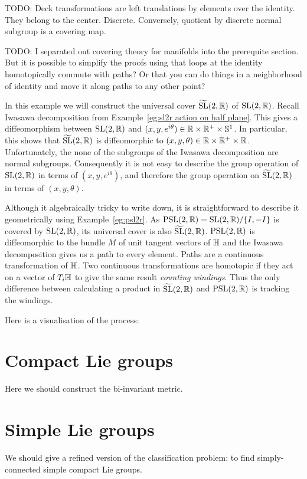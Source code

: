 TODO: Deck transformations are left translations by elements over the identity. They belong to the center. Discrete. Conversely, quotient by discrete normal subgroup is a covering map.

TODO: I separated out covering theory for manifolds into the prerequite section. But it is possible to simplify the proofs using that loops at the identity homotopically commute with paths? Or that you can do things in a neighborhood of identity and move it along paths to any other point?


\begin{example}
In this example we will construct the universal cover $\widetilde{\mathrm{SL}}(2,\mathbb{R})$ of $\mathrm{SL}(2,\mathbb{R})$.
Recall Iwasawa decomposition from Example~\ref{eg:sl2r action on half plane}.
This gives a diffeomorphism between $\mathrm{SL}(2,\mathbb{R})$ and $(x,y,e^{i\theta}) \in \mathbb{R} \times \mathbb{R}^+ \times \mathbb{S}^1$.
In particular, this shows that $\widetilde{\mathrm{SL}}(2,\mathbb{R})$ is diffeomorphic to $(x,y,\theta) \in \mathbb{R} \times \mathbb{R}^+ \times \mathbb{R}$.
Unfortunately, the none of the subgroups of the Iwasawa decomposition are normal subgroups.
Consequently it is not easy to describe the group operation of $\mathrm{SL}(2,\mathbb{R})$ in terms of $(x,y,e^{i\theta})$, and therefore the group operation on $\widetilde{\mathrm{SL}}(2,\mathbb{R})$ in terms of $(x,y,\theta)$.

Although it algebraically tricky to write down, it is straightforward to describe it geometrically using Example~\ref{eg:psl2r}.
As $\mathrm{PSL}(2,\mathbb{R}) = \mathrm{SL}(2,\mathbb{R})/\{I,-I\}$ is covered by $\mathrm{SL}(2,\mathbb{R})$, its universal cover is also $\widetilde{\mathrm{SL}}(2,\mathbb{R})$.
$\mathrm{PSL}(2,\mathbb{R})$ is diffeomorphic to the bundle $M$ of unit tangent vectors of $\mathbb{H}$ and the Iwasawa decomposition gives us a path to every element.
Paths are a continuous transformation of $\mathbb{H}$.
Two continuous transformations are homotopic if they act on a vector of $T_i\mathbb{H}$ to give the same result \emph{counting windings}.
Thus the only difference between calculating a product in $\widetilde{\mathrm{SL}}(2,\mathbb{R})$ and $\mathrm{PSL}(2,\mathbb{R})$ is tracking the windings.
\begin{webonly}
Here is a visualisation of the process:
\end{webonly}
\end{example}



\section{Compact Lie groups}

Here we should construct the bi-invariant metric.


\section{Simple Lie groups}
We should give a refined version of the classification problem: to find simply-connected simple compact Lie groups.
